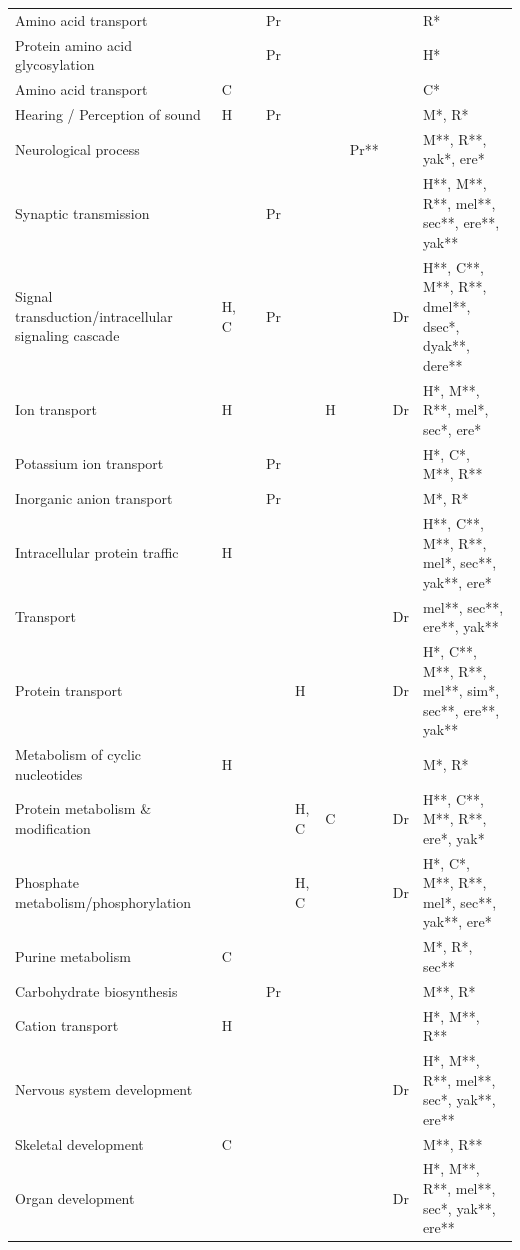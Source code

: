 \begin{FPtable}
{\begin{tabular}{ p{8.5cm} p{0.8cm} p{0.8cm} p{0.5cm} p{0.8cm} p{0.5cm} p{0.85cm} p{0.5cm} p{8cm}}
  Amino acid transport &  &  & Pr &  &  &  &  & R* \\
  Protein amino acid glycosylation &  &  & Pr &  &  &  &  & H* \\
  Amino acid transport & C &  &  &  &  &  &  & C* \\
  Hearing / Perception of sound & H &  & Pr &  &  &  &  & M*, R* \\
  Neurological process &  &  &  &  &  & Pr** &  & M**, R**, yak*, ere* \\
  Synaptic transmission &  &  & Pr &  &  &  &  & H**, M**, R**, mel**, sec**, ere**, yak** \\
  Signal transduction/intracellular signaling cascade & H, C &  & Pr &  &  &  & Dr & H**, C**, M**, R**, dmel**, dsec*, dyak**, dere** \\
  Ion transport & H &  &  &  & H &  & Dr & H*, M**, R**, mel*, sec*, ere* \\
  Potassium ion transport &  &  & Pr &  &  &  &  & H*, C*, M**, R** \\
  Inorganic anion transport &  &  & Pr &  &  &  &  & M*, R* \\
  Intracellular protein traffic & H &  &  &  &  &  &  & H**, C**, M**, R**, mel*, sec**, yak**, ere* \\
  Transport &  &  &  &  &  &  & Dr & mel**, sec**, ere**, yak** \\
  Protein transport &  &  &  & H &  &  & Dr & H*, C**, M**, R**, mel**, sim*, sec**, ere**, yak** \\
  Metabolism of cyclic nucleotides & H &  &  &  &  &  &  & M*, R* \\
  Protein metabolism \& modification &  &  &  & H, C & C &  & Dr & H**, C**, M**, R**, ere*, yak* \\
  Phosphate metabolism/phosphorylation &  &  &  & H, C &  &  & Dr & H*, C*, M**, R**, mel*, sec**, yak**, ere* \\
  Purine metabolism & C &  &  &  &  &  &  & M*, R*, sec** \\
  Carbohydrate biosynthesis &  &  & Pr &  &  &  &  & M**, R* \\
  Cation transport & H &  &  &  &  &  &  & H*, M**, R** \\
  Nervous system development &  &  &  &  &  &  & Dr & H*, M**, R**, mel**, sec*, yak**, ere** \\
  Skeletal development & C &  &  &  &  &  &  & M**, R** \\
  Organ development &  &  &  &  &  &  & Dr & H*, M**, R**, mel**, sec*, yak**, ere** \\

\end{tabular}}
\end{FPtable}

